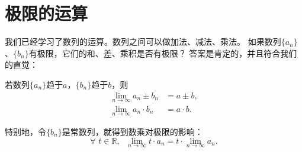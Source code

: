 \documentclass[12pt,UTF8]{ctexbook}
\begin{document}
\section{极限的运算}
我们已经学习了数列的运算。数列之间可以做加法、减法、乘法。
如果数列$\{a_n\}$、$\{b_n\}$有极限，它们的和、差、乘积是否有极限？
答案是肯定的，并且符合我们的直觉：
\begin{tm}
    若数列$\{a_n\}$趋于$a$，$\{b_n\}$趋于$b$，则
    \begin{align*}
        \lim_{n\to\infty} a_n \pm b_n &= a \pm b,  \\
        \lim_{n\to\infty} a_n \cdot b_n &= a \cdot b.  
    \end{align*}
\end{tm}
特别地，令$\{b_n\}$是常数列，就得到数乘对极限的影响：
$$ \forall \,\, t \in \mathbb{R}, \;\,\,  \lim_{n\to\infty} t \cdot a_n = t \cdot \lim_{n\to\infty} a_n. $$
\end{document}
